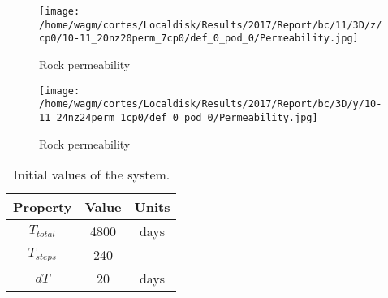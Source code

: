 \documentclass[12pt]{article}
\begin{document}
\begin{figure}[!h] \hspace{-1cm}
\begin{minipage}{.5\textwidth}
 \centering
\texttt{[image: /home/wagm/cortes/Localdisk/Results/2017/Report/bc/11/3D/z/cp0/10-11\_20nz20perm\_7cp0/def\_0\_pod\_0/Permeability.jpg]}
\caption{Rock permeability}
\label{fig:rockperm3d1}
\end{minipage}%
\begin{minipage}{.5\textwidth}
 \centering
\texttt{[image: /home/wagm/cortes/Localdisk/Results/2017/Report/bc/3D/y/10-11\_24nz24perm\_1cp0/def\_0\_pod\_0/Permeability.jpg]}
\caption{Rock permeability}
\label{fig:rockperm3d2}
\end{minipage}%
\end{figure}




\begin{table}[!ht]
 \centering
 \begin{tabular}{ |c|c|c|} 
 \hline
 Property&Value&Units\\
 \hline
$T_{total}$&     4800& days\\
$T_{steps}$& 240&\\
$dT$& 20&days\\
 \hline
 \end{tabular}\caption{Initial values of the system.}
 \label{table:ic}
\end{table} 
\end{document}

